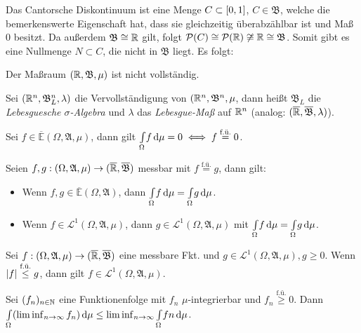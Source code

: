 \documentclass{cheat-sheet}
\newcommand{\PS}{\mathcal{P}} %
\newcommand{\Alg}{\mathfrak{A}} %
\newcommand{\Bor}{\mathfrak{B}} %
\newcommand{\E}{\mathbb{E}} %
\newcommand{\Leb}{\mathcal{L}} %
\newcommand{\fue}{\overset{\text{f.ü.}}} %
\theoremstyle{definition}
\newcommand{\IntOmu}[1]{\Int{\Omega}{}{#1}{\mu}} %
\begin{document}

\begin{bem}
  Das Cantorsche Diskontinuum ist eine Menge $C \subset \left[ 0, 1 \right]$, $C \in \Bor$, welche die bemerkenswerte Eigenschaft hat, dass sie gleichzeitig überabzählbar ist und Maß $0$ besitzt. Da außerdem $\Bor \cong \R$ gilt, folgt $\PS(C) \cong \PS(\R) \not\cong \R \cong \Bor$. Somit gibt es eine Nullmenge $N \subset C$, die nicht in $\Bor$ liegt. Es folgt:
\end{bem}

\begin{satz}
  Der Maßraum $(\R, \Bor, \mu)$ ist nicht vollständig.
\end{satz}

\begin{defn}
  Sei $(\R^n, \Bor_L^n, \lambda)$ die Vervollständigung von $(\R^n, \Bor^n, \mu$, dann heißt $\Bor_L$ die \emph{Lebesguesche $\sigma$-Algebra} und $\lambda$ das \emph{Lebesgue-Maß} auf $\mathbb{R}^n$ (analog: $(\ER, \overline{\Bor}, \lambda)$).
\end{defn}

\begin{satz}
  Sei $f \in \overline{\E}(\Omega, \Alg, \mu)$, dann gilt $\IntOmu{f} = 0 \iff f \overset{\text{f.ü.}}= 0$.
\end{satz}

\vspace{-10pt}

\begin{satz}
  Seien $f, g : (\Omega, \Alg, \mu) \to (\ER, \overline{\Bor})$ messbar mit $f \fue= g$, dann gilt:
  \begin{itemize}
    \item Wenn $f, g \in \overline{\E}(\Omega, \Alg)$, dann $\IntOmu{f} = \IntOmu{g}$.
    \item Wenn $f \in \Leb^1(\Omega, \Alg, \mu)$, dann $g \in \Leb^1(\Omega, \Alg, \mu)$ mit $\IntOmu{f} = \IntOmu{g}$.
  \end{itemize}
\end{satz}

\begin{satz}
  Sei $f : (\Omega, \Alg, \mu) \to (\ER, \overline{\Bor})$ eine messbare Fkt. und $g \in \Leb^1(\Omega, \Alg, \mu), g \geq 0$. Wenn $\abs{f} \fue\leq g$, dann gilt $f \in \Leb^1(\Omega, \Alg, \mu)$.
\end{satz}


\begin{satz}\begin{doublespace}
  Sei $(f_n)_{n \in \mathbb{N}}$ eine Funktionenfolge mit $f_n$ $\mu$-integrierbar und $f_n \overset{\text{f.ü.}}\geq 0$. Dann $\IntOmu{(\liminf_{n \to \infty} f_n)} \leq \liminf_{n \to \infty} \IntOmu{fn}$.
\end{doublespace}\end{satz}
\end{document}
